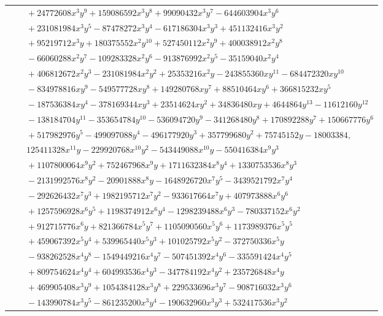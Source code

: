 \documentclass[11pt]{article}
\begin{document}
\begin{longtable}{@{}ll@{}}
 & $\quad +24772608x^{3}y^{9}+159086592x^{3}y^{8}+99090432x^{3}y^{7}-644603904x^{3}y^{6}$\\
 & $\quad +231081984x^{3}y^{5}-87478272x^{3}y^{4}-617186304x^{3}y^{3}+451132416x^{3}y^{2}$\\
 & $\quad +95219712x^{3}y+180375552x^{2}y^{10}+527450112x^{2}y^{9}+400038912x^{2}y^{8}$\\
 & $\quad -66060288x^{2}y^{7}-109283328x^{2}y^{6}-913876992x^{2}y^{5}-35159040x^{2}y^{4}$\\
 & $\quad +406812672x^{2}y^{3}-231081984x^{2}y^{2}+25353216x^{2}y-243855360xy^{11}-684472320xy^{10}$\\
 & $\quad -834978816xy^{9}-549577728xy^{8}+149280768xy^{7}+88510464xy^{6}+366815232xy^{5}$\\
 & $\quad -187536384xy^{4}-378169344xy^{3}+23514624xy^{2}+34836480xy+4644864y^{13}-11612160y^{12}$\\
 & $\quad -138184704y^{11}-353654784y^{10}-536094720y^{9}-341268480y^{8}+170892288y^{7}+150667776y^{6}$\\
 & $\quad +517982976y^{5}-499097088y^{4}-496177920y^{3}+357799680y^{2}+75745152y-18003384,$\\
 & $\quad 125411328x^{11}y-229920768x^{10}y^{2}-543449088x^{10}y-550416384x^{9}y^{3}$\\
 & $\quad +1107800064x^{9}y^{2}+752467968x^{9}y+1711632384x^{8}y^{4}+1330753536x^{8}y^{3}$\\
 & $\quad -2131992576x^{8}y^{2}-20901888x^{8}y-1648926720x^{7}y^{5}-3439521792x^{7}y^{4}$\\
 & $\quad -292626432x^{7}y^{3}+1982195712x^{7}y^{2}-933617664x^{7}y+407973888x^{6}y^{6}$\\
 & $\quad +1257596928x^{6}y^{5}+1198374912x^{6}y^{4}-1298239488x^{6}y^{3}-780337152x^{6}y^{2}$\\
 & $\quad +912715776x^{6}y+821366784x^{5}y^{7}+1105090560x^{5}y^{6}+1173989376x^{5}y^{5}$\\
 & $\quad +459067392x^{5}y^{4}+539965440x^{5}y^{3}+101025792x^{5}y^{2}-372750336x^{5}y$\\
 & $\quad -938262528x^{4}y^{8}-1549449216x^{4}y^{7}-507451392x^{4}y^{6}-335591424x^{4}y^{5}$\\
 & $\quad +809754624x^{4}y^{4}+604993536x^{4}y^{3}-347784192x^{4}y^{2}+235726848x^{4}y$\\
 & $\quad +469905408x^{3}y^{9}+1054384128x^{3}y^{8}+229533696x^{3}y^{7}-908716032x^{3}y^{6}$\\
 & $\quad -143990784x^{3}y^{5}-861235200x^{3}y^{4}-190632960x^{3}y^{3}+532417536x^{3}y^{2}$\\

\end{longtable}
\end{document}
